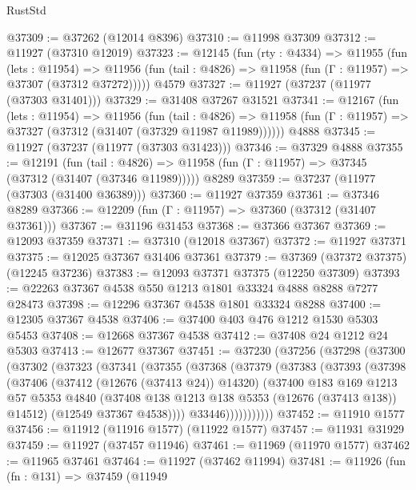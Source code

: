 \begin{lexlean}{RustStd}
\begin{coremodule}
@37309 := @37262 (@12014 @8396)
@37310 := @11998 @37309
@37312 := @11927 (@37310 @12019)
@37323 := @12145
    (fun (rty : @4334) =>
    @11955
      (fun (lets : @11954) =>
      @11956 (fun (tail : @4826) => @11958 (fun (Γ : @11957) => @37307 (@37312 @37272)))))
    @4579
@37327 := @11927 (@37237 (@11977 (@37303 @31401)))
@37329 := @31408 @37267 @31521
@37341 := @12167
    (fun (lets : @11954) =>
    @11956
      (fun (tail : @4826) =>
      @11958 (fun (Γ : @11957) => @37327 (@37312 (@31407 (@37329 @11987 @11989))))))
    @4888
@37345 := @11927 (@37237 (@11977 (@37303 @31423)))
@37346 := @37329 @4888
@37355 := @12191
    (fun (tail : @4826) => @11958 (fun (Γ : @11957) => @37345 (@37312 (@31407 (@37346 @11989)))))
    @8289
@37359 := @37237 (@11977 (@37303 (@31400 @36389)))
@37360 := @11927 @37359
@37361 := @37346 @8289
@37366 := @12209 (fun (Γ : @11957) => @37360 (@37312 (@31407 @37361)))
@37367 := @31196 @31453
@37368 := @37366 @37367
@37369 := @12093 @37359
@37371 := @37310 (@12018 @37367)
@37372 := @11927 @37371
@37375 := @12025 @37367 @31406 @37361
@37379 := @37369 (@37372 @37375) (@12245 @37236)
@37383 := @12093 @37371 @37375 (@12250 @37309)
@37393 := @22263 @37367 @4538 @550 @1213 @1801 @33324 @4888 @8288 @7277 @28473
@37398 := @12296 @37367 @4538 @1801 @33324 @8288
@37400 := @12305 @37367 @4538
@37406 := @37400 @403 @476 @1212 @1530 @5303 @5453
@37408 := @12668 @37367 @4538
@37412 := @37408 @24 @1212 @24 @5303
@37413 := @12677 @37367
@37451 := @37230
    (@37256
      (@37298
        (@37300
          (@37302
            (@37323
              (@37341
                (@37355
                  (@37368
                    (@37379
                      (@37383
                        (@37393
                          (@37398
                            (@37406
                              (@37412 (@12676 (@37413 @24)) @14320)
                              (@37400
                                @183
                                @169
                                @1213
                                @57
                                @5353
                                @4840
                                (@37408 @138 @1213 @138 @5353 (@12676 (@37413 @138)) @14512)
                                (@12549 @37367 @4538))))
                          @33446)))))))))))
@37452 := @11910 @1577
@37456 := @11912 (@11916 @1577) (@11922 @1577)
@37457 := @11931 @31929
@37459 := @11927 (@37457 @11946)
@37461 := @11969 (@11970 @1577)
@37462 := @11965 @37461
@37464 := @11927 (@37462 @11994)
@37481 := @11926
    (fun (fn : @131) =>
    @37459
      (@11949

\end{coremodule}
\end{lexlean}
